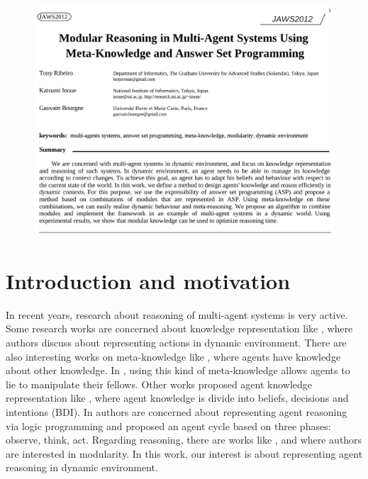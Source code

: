 \documentclass{aamas2012}
\begin{document}
	\begin{figure}
		\includegraphics{page1.pdf}
	\end{figure}
	
	\clearpage

\section{Introduction and motivation}

	In recent years, research about reasoning of multi-agent systems is very active.
	Some research works are concerned about knowledge representation like \cite{DBLP:conf/birthday/BaralG11},
	where authors discuss about representing actions in dynamic environment.
	There are also interesting works on meta-knowledge like \cite{DBLP:conf/atal/BaralGSP10}, 
	where agents have knowledge about other knowledge.
	In \cite{DBLP:conf/ijcai/SakamaSP11}, using this kind of meta-knowledge allows agents to lie to manipulate their fellows.
	Other works proposed agent knowledge representation like \cite{DBLP:conf/icmas/RaoG95}, 
	where agent knowledge is divide into beliefs, decisions and intentions (BDI).
	In \cite{DBLP:journals/amai/KowalskiS99} authors are concerned about representing agent reasoning via logic programming 
	and proposed an agent cycle based on three phases: observe, think, act.
	Regarding reasoning, there are works like \cite{DBLP:conf/datalog/Costantini10}, \cite{DBLP:conf/lpnmr/Costantini09}
	and \cite{DBLP:conf/aaaiss/BaralAD06} where authors are interested in modularity.
	In this work, our interest is about representing agent reasoning in dynamic environment.
	
\end{document}
